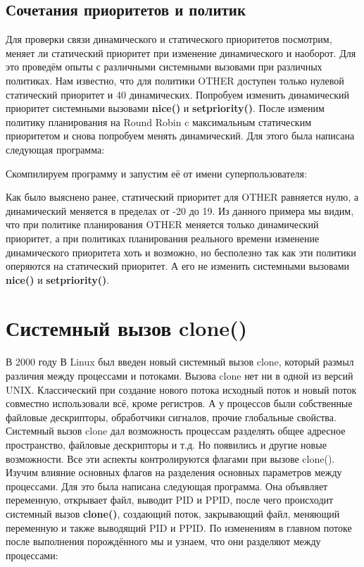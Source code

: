 \documentclass[a4paper]{article}
\begin{document}
\subsection{Сочетания приоритетов и политик}
	Для проверки связи динамического и статического приоритетов посмотрим, меняет ли статический приоритет при изменение динамического и наоборот. Для это проведём опыты с различными системными вызовами при различных политиках. Нам известно, что для политики OTHER доступен только нулевой статический приоритет и 40 динамических. Попробуем изменить динамический приоритет системными вызовами \textbf{nice()} и \textbf{setpriority()}. После изменим политику планирования на Round Robin c максимальным статическим приоритетом и снова попробуем менять динамический. Для этого была написана следующая программа:
	
	Скомпилируем программу и запустим её от имени суперпользователя:
	
	Как было выяснено ранее, статический приоритет для OTHER равняется нулю, а динамический меняется в пределах от -20 до 19. Из данного примера мы видим, что при политике планирования OTHER меняется только динамический приоритет, а при политиках планирования реального времени изменение динамического приоритета хоть и возможно, но бесполезно так как эти политики оперяются на статический приоритет. А его не изменить системными вызовами \textbf{nice()} и \textbf{setpriority()}.


	\section{Системный вызов clone()}
	В 2000 году В Linux был введен новый системный вызов clone, который размыл различия между процессами и потоками. Вызова clone нет ни в одной из версий UNIX. Классический при создание нового потока исходный поток и новый поток совместно использовали всё, кроме регистров. А у процессов были собственные файловые дескрипторы, обработчики сигналов, прочие глобальные свойства. Системный вызов clone дал возможность процессам разделять общее адресное пространство, файловые дескрипторы и т.д. Но появились и другие новые возможности. Все эти аспекты контролируются флагами при вызове clone().\\
	Изучим влияние основных флагов на разделения основных параметров между процессами. Для это была написана следующая программа. Она объявляет переменную, открывает файл, выводит PID и PPID, после чего происходит системный вызов \textbf{clone()}, создающий поток, закрывающий файл, меняющий переменную и также выводящий PID и PPID. По изменениям в главном потоке после выполнения порождённого мы и узнаем, что они разделяют между процессами:
\end{document}
